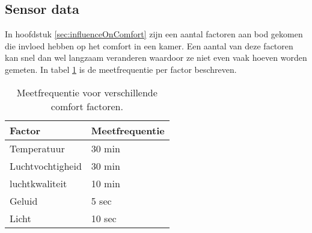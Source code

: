 \subsection{Sensor data}
In hoofdstuk \ref{sec:influenceOnComfort} zijn een aantal factoren aan bod gekomen die invloed hebben op het comfort in een kamer. Een aantal van deze factoren kan snel dan wel langzaam veranderen waardoor ze niet even vaak hoeven worden gemeten. In tabel \ref{tabel:meetfrequentie} is de meetfrequentie per factor beschreven.
\begin{table}[h]
    \centering
    \begin{tabular}{|l|l|}\hline
        Factor           & Meetfrequentie \\\hline
        Temperatuur      & 30 min         \\\hline
        Luchtvochtigheid & 30 min         \\\hline
        luchtkwaliteit   & 10 min         \\\hline
        Geluid           & 5 sec          \\\hline
        Licht            & 10 sec         \\\hline
    \end{tabular}
    \caption{Meetfrequentie voor verschillende comfort factoren.}
    \label{tabel:meetfrequentie}
\end{table}